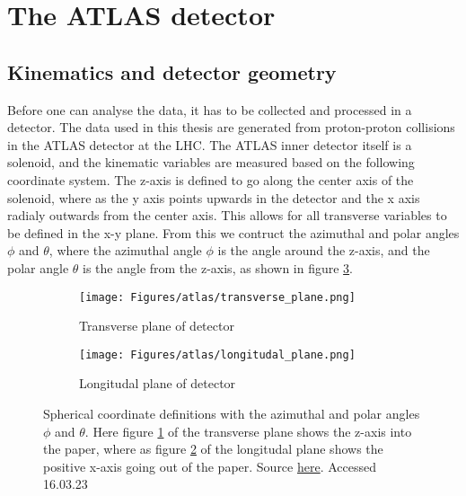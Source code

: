 \section{The ATLAS detector}

\subsection*{Kinematics and detector geometry}
Before one can analyse the data, it has to be collected and processed in a detector. The data used in this thesis 
are generated from proton-proton collisions in the ATLAS detector at the LHC. The ATLAS inner detector itself is a solenoid, 
and the kinematic variables are measured based on the following coordinate system. The z-axis is defined to go 
along the center axis of the solenoid, where as the y axis points upwards in the detector and the x axis radialy 
outwards from the center axis. This allows for all transverse variables to be defined in the x-y plane\cite{Gramstad:1631043}. 
From this we contruct the azimuthal and polar angles $\phi$ and $\theta$, where the azimuthal angle $\phi$\cite{Airapetian:391176} is the angle around the z-axis, 
and the polar angle $\theta$ is the angle from the z-axis, as shown in figure \ref{fig:long_trans_plane}.


\begin{figure}[H]
    \centering
    \begin{subfigure}{.45\textwidth}
        \texttt{[image: Figures/atlas/transverse\_plane.png]}
        \caption{Transverse plane of detector}
        \label{fig:transverse_plane}
    \end{subfigure}
    \hfill
    \begin{subfigure}{.45\textwidth}
        \texttt{[image: Figures/atlas/longitudal\_plane.png]}
        \caption{Longitudal plane of detector}
        \label{fig:longitudal_plane}
    \end{subfigure}
    \hfill
    \caption[ATLAS detector longitudal and azimuthal diagrams]{Spherical coordinate definitions with the azimuthal and polar angles $\phi$ and $\theta$. Here figure \ref{fig:transverse_plane} of the transverse plane shows the z-axis
     into the paper, where as figure \ref{fig:longitudal_plane} of the longitudal plane shows the positive x-axis going out of the paper. Source \href{https://www.duo.uio.no/bitstream/handle/10852/37785/thesis_clean_embedded.pdf?sequence=2&isAllowed=y}{here}. Accessed 16.03.23 }
    \label{fig:long_trans_plane}
\end{figure}


